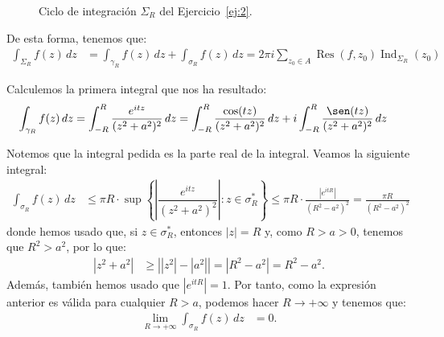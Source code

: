 \documentclass[12pt]{article}
\DeclareMathOperator{\Ind}{Ind}
\DeclareMathOperator{\Res}{Res}
\begin{document}
\begin{ejercicio}[2.5 puntos]
\begin{figure}
            \caption{Ciclo de integración $\Sigma_R$ del Ejercicio~\ref{ej:2}.}
            \label{fig:ej:2}
        \end{figure}

        De esta forma, tenemos que:
        \begin{align*}
            \int_{\Sigma_R} f(z) \, dz &= \int_{\gamma_R} f(z) \, dz + \int_{\sigma_R} f(z) \, dz
            = 2\pi i\sum_{z_0\in A}\Res(f,z_0)\Ind_{\Sigma_R}(z_0)
        \end{align*}

        Calculemos la primera integral que nos ha resultado:
        \begin{align*}
            \int_{\gamma_R} f(z) \, dz &= \int_{-R}^{R} \frac{e^{i t z}}{(z^2 + a^2)^2} \, dz
            = \int_{-R}^{R} \frac{\cos(t z)}{(z^2 + a^2)^2} \, dz
            + i\int_{-R}^{R} \frac{\sen(t z)}{(z^2 + a^2)^2} \, dz
        \end{align*}

        Notemos que la integral pedida es la parte real de la integral. Veamos la siguiente integral:
        \begin{align*}
            \int_{\sigma_R} f(z) \, dz &\leq \pi R\cdot \sup\left\{\left|\dfrac{e^{i t z}}{(z^2 + a^2)^2}\right| : z\in \sigma_R^*\right\}
            \leq \pi R\cdot \frac{|e^{i t R}|}{(R^2 - a^2)^2}= \frac{\pi R}{(R^2 - a^2)^2}
        \end{align*}
        donde hemos usado que, si $z\in \sigma_R^*$, entonces $|z|=R$ y, como $R>a>0$, tenemos que $R^2>a^2$, por lo que:
        \begin{align*}
            |z^2 + a^2| &\geq \left||z^2| - |a^2|\right| = \left|R^2 - a^2\right| = R^2 - a^2.
        \end{align*}
        Además, también hemos usado que $|e^{i t R}| = 1$. Por tanto, como la expresión anterior es válida para cualquier $R > a$, podemos hacer $R \to +\infty$ y tenemos que:
        \begin{align*}
            \lim_{R\to+\infty} \int_{\sigma_R} f(z) \, dz &= 0.
        \end{align*}


\end{ejercicio}
\end{document}
